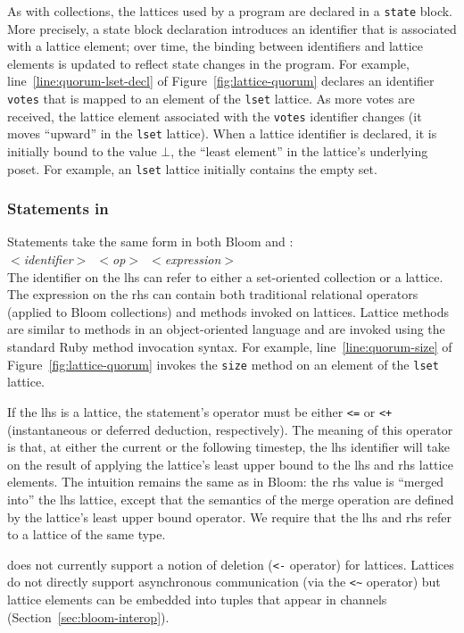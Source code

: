 As with collections, the lattices used by a \lang program are declared in a
\texttt{state} block. More precisely, a state block declaration introduces an
identifier that is associated with a lattice element; over time, the binding
between identifiers and lattice elements is updated to reflect state changes in
the program. For example, line~\ref{line:quorum-lset-decl} of
Figure~\ref{fig:lattice-quorum} declares an identifier \texttt{votes} that is
mapped to an element of the \texttt{lset} lattice. As more votes are received,
the lattice element associated with the \texttt{votes} identifier changes (it
moves ``upward'' in the \texttt{lset} lattice). When a lattice identifier is
declared, it is initially bound to the value $\bot$, the ``least element'' in
the lattice's underlying poset. For example, an \texttt{lset} lattice initially
contains the empty set.

\subsubsection{Statements in \lang}
Statements take the same form in both Bloom and \lang: \\ \noindent
\mbox{\hspace{0.25in}\emph{$<$identifier$>$ $<$op$>$
    $<$expression$>$}}\\ \noindent
The identifier on the lhs can refer to either a set-oriented collection or a
lattice. The expression on the rhs can contain both traditional relational
operators (applied to Bloom collections) and methods invoked on lattices.
Lattice methods are similar to methods in an object-oriented language and are
invoked using the standard Ruby method invocation syntax. For example,
line~\ref{line:quorum-size} of Figure~\ref{fig:lattice-quorum} invokes the
\texttt{size} method on an element of the \texttt{lset} lattice.

If the lhs is a lattice, the statement's operator must be either \verb|<=| or
\verb|<+| (instantaneous or deferred deduction, respectively). The meaning of
this operator is that, at either the current or the following timestep, the lhs
identifier will take on the result of applying the lattice's least upper bound
to the lhs and rhs lattice elements. The intuition remains the same as in Bloom:
the rhs value is ``merged into'' the lhs lattice, except that the semantics of
the merge operation are defined by the lattice's least upper bound operator. We
require that the lhs and rhs refer to a lattice of the same type.

\lang does not currently support a notion of deletion (\verb|<-| operator) for
lattices. Lattices do not directly support asynchronous communication (via the
\verb|<~| operator) but lattice elements can be embedded into tuples that appear
in channels (Section~\ref{sec:bloom-interop}).

